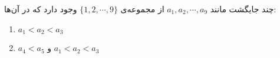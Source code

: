 \EXERCISE
چند جایگشت مانند
$a_1, a_2, \cdots, a_9$
از مجموعه‌ی
$\{1, 2, \cdots, 9\}$
وجود دارد که در آن‌ها:
\begin{enumerate}
\item
$a_1 < a_2 < a_3$
\item
$a_4 < a_5$
و
$a_1 < a_2 < a_3$
\end{enumerate}